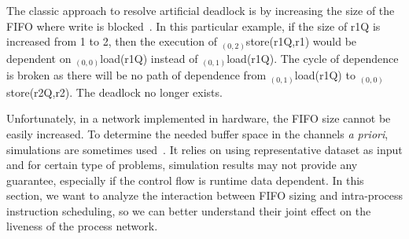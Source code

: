 \documentclass{sig-alternate}
\begin{document}

The classic approach to resolve artificial deadlock is by increasing the size of the FIFO where write is blocked~\cite{parks1995bounded}. 
In this particular example, if the size of r1Q is increased
from 1 to 2, then the execution of $_{(0,2)}$store(r1Q,r1) would be dependent on 
$_{(0,0)}$load(r1Q) instead of $_{(0,1)}$load(r1Q). The cycle of dependence is broken as there will be no path of dependence from $_{(0,1)}$load(r1Q)
to $_{(0,0)}$store(r2Q,r2). The deadlock no longer exists.

Unfortunately, in a network implemented in hardware, the FIFO size cannot be easily increased.
To determine the needed buffer space in the channels \textit{a priori}, simulations are sometimes used~\cite{buck1994ptolemy}. It relies 
on using representative dataset as input and for certain type of problems, simulation results may not provide any guarantee, especially if the control flow is runtime data dependent. In this section, we want to analyze the interaction between FIFO
sizing and intra-process instruction scheduling, 
so we can better understand
their joint effect on the liveness of the process network.
\end{document}
